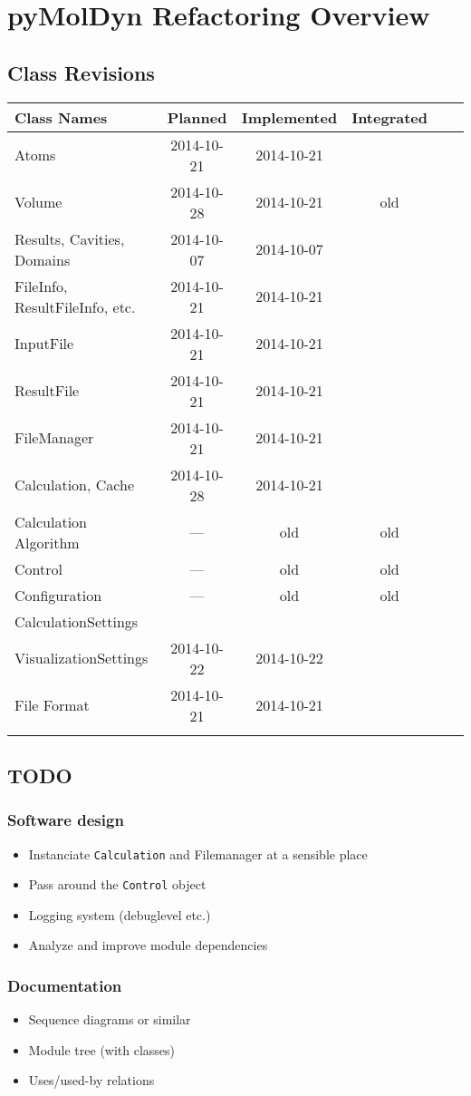 \documentclass[final, oneside, a4paper, 11pt, pdftex, english]{scrreprt}
\begin{document}
\chapter*{pyMolDyn Refactoring Overview}
\section*{Class Revisions}

\begin{tabular}{|l|c|c|c|c|c|}
    \hline
    \textbf{Class Names} & \textbf{Planned} & \textbf{Implemented} & \textbf{Integrated} \\
    \hline
    Atoms & 2014-10-21 & 2014-10-21 & \\
    \hline
    Volume & 2014-10-28 & 2014-10-21 & old \\
    \hline
    Results, Cavities, Domains & 2014-10-07 & 2014-10-07 & \\
    \hline
    FileInfo, ResultFileInfo, etc. & 2014-10-21 & 2014-10-21 & \\
    \hline
    InputFile & 2014-10-21 & 2014-10-21 & \\
    \hline
    ResultFile & 2014-10-21 & 2014-10-21 & \\
    \hline
    FileManager & 2014-10-21 & 2014-10-21 & \\
    \hline
    Calculation, Cache & 2014-10-28 & 2014-10-21 & \\
    \hline
    Calculation Algorithm & --- & old & old \\
    \hline
    Control & --- & old & old \\
    \hline
    Configuration & --- & old & old \\
    \hline
    CalculationSettings & & & \\
    \hline
    VisualizationSettings & 2014-10-22 & 2014-10-22 & \\
    \hline
    File Format & 2014-10-21 & 2014-10-21 & \\
    \hline
    & & & \\
    \hline
\end{tabular}


\section*{TODO}
\subsection*{Software design}
\begin{itemize}\itemsep0pt
    \item Instanciate \texttt{Calculation} and Filemanager at a sensible place
    \item Pass around the \texttt{Control} object
    \item Logging system (debuglevel etc.)
    \item Analyze and improve module dependencies
\end{itemize}


\subsection*{Documentation}
\begin{itemize}\itemsep0pt
    \item Sequence diagrams or similar
    \item Module tree (with classes)
    \item Uses/used-by relations
\end{itemize}
\end{document}
